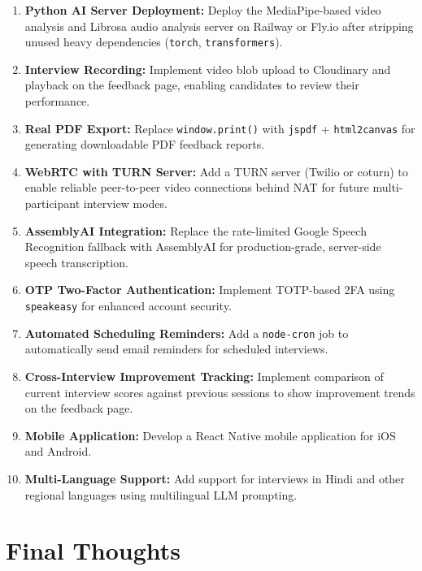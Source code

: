 \begin{enumerate}
    \item \textbf{Python AI Server Deployment:} Deploy the MediaPipe-based video analysis and Librosa audio analysis server on Railway or Fly.io after stripping unused heavy dependencies (\texttt{torch}, \texttt{transformers}).

    \item \textbf{Interview Recording:} Implement video blob upload to Cloudinary and playback on the feedback page, enabling candidates to review their performance.

    \item \textbf{Real PDF Export:} Replace \texttt{window.print()} with \texttt{jspdf} + \texttt{html2canvas} for generating downloadable PDF feedback reports.

    \item \textbf{WebRTC with TURN Server:} Add a TURN server (Twilio or coturn) to enable reliable peer-to-peer video connections behind NAT for future multi-participant interview modes.

    \item \textbf{AssemblyAI Integration:} Replace the rate-limited Google Speech Recognition fallback with AssemblyAI for production-grade, server-side speech transcription.

    \item \textbf{OTP Two-Factor Authentication:} Implement TOTP-based 2FA using \texttt{speakeasy} for enhanced account security.

    \item \textbf{Automated Scheduling Reminders:} Add a \texttt{node-cron} job to automatically send email reminders for scheduled interviews.

    \item \textbf{Cross-Interview Improvement Tracking:} Implement comparison of current interview scores against previous sessions to show improvement trends on the feedback page.

    \item \textbf{Mobile Application:} Develop a React Native mobile application for iOS and Android.

    \item \textbf{Multi-Language Support:} Add support for interviews in Hindi and other regional languages using multilingual LLM prompting.
\end{enumerate}

\section{Final Thoughts}

